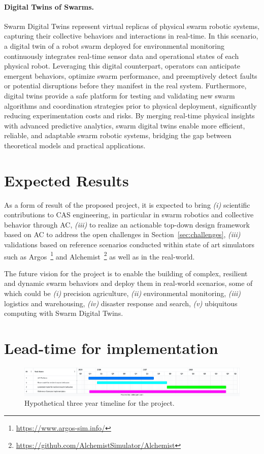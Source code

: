 \documentclass[12pt]{article}
\begin{document}
\paragraph{Digital Twins of Swarms.}
Swarm Digital Twins represent virtual replicas of physical swarm robotic systems, capturing their collective behaviors and interactions in real-time. 
In this scenario, a digital twin of a robot swarm deployed for environmental monitoring continuously integrates real-time sensor data and operational states of each physical robot. 
Leveraging this digital counterpart, operators can anticipate emergent behaviors, optimize swarm performance, and preemptively detect faults or potential disruptions before they manifest in the real system. 
Furthermore, digital twins provide a safe platform for testing and validating new swarm algorithms and coordination strategies prior to physical deployment, significantly reducing experimentation costs and risks. 
By merging real-time physical insights with advanced predictive analytics, swarm digital twins enable more efficient, reliable, and adaptable swarm robotic systems, bridging the gap between theoretical models and practical applications.
\section{Expected Results}
As a form of result of the proposed project, it is expected to bring \textit{(i)} scientific contributions to CAS engineering, in particular in swarm robotics and collective behavior through AC,
\textit{(iii)} to realize an actionable top-down design framework based on AC to address the open challenges in Section~\ref{sec:challenges}, 
\textit{(iii)} validations based on reference scenarios conducted within state of art simulators such as Argos~\footnote{\url{https://www.argos-sim.info/}} and Alchemist~\footnote{\url{https://github.com/AlchemistSimulator/Alchemist}} as well
as in the real-world.

The future vision for the project is to enable the building of complex, resilient and dynamic swarm behaviors and deploy them in real-world scenarios, some of which could be \textit{(i)} precision agriculture,
\textit{(ii)} environmental monitoring, \textit{(iii)} logistics and warehousing, \textit{(iv)} disaster response and search, 
\textit{(v)} ubiquitous computing with Swarm Digital Twins.

\section{Lead-time for implementation}
\begin{figure}
	\includegraphics[width=\linewidth]{figures/timeline.png}
	\caption{Hypothetical three year timeline for the project.}
	\label{fig:timeline}
\end{figure}
\end{document}

